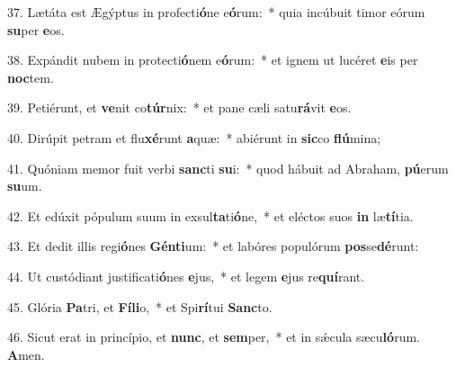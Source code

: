 37. Lætáta est Ægýptus in profecti\textbf{ó}ne e\textbf{ó}rum:~*  quia incúbuit timor eórum \textbf{su}per \textbf{e}os.\

38. Expándit nubem in protecti\textbf{ó}nem e\textbf{ó}rum:~*  et ignem ut lucéret \textbf{e}is per \textbf{noc}tem.\

39. Petiérunt, et \textbf{ve}nit co\textbf{túr}nix:~*  et pane cæli satu\textbf{rá}vit \textbf{e}os.\

40. Dirúpit petram et flu\textbf{xé}runt \textbf{a}quæ:~*  abiérunt in \textbf{sic}co \textbf{flú}mina;\

41. Quóniam memor fuit verbi \textbf{sanc}ti \textbf{su}i:~*  quod hábuit ad Abraham, \textbf{pú}erum \textbf{su}um.\

42. Et edúxit pópulum suum in exsul\textbf{ta}ti\textbf{ó}ne,~*  et eléctos suos \textbf{in} læ\textbf{tí}tia.\

43. Et dedit illis regi\textbf{ó}nes \textbf{Gén}\textbf{ti}um:~*  et labóres populórum \textbf{pos}se\textbf{dé}runt:\

44. Ut custódiant justificati\textbf{ó}nes \textbf{e}jus,~*  et legem \textbf{e}jus re\textbf{quí}rant.\

45. Glória \textbf{Pa}tri, et \textbf{Fí}\textbf{li}o,~*  et Spi\textbf{rí}tui \textbf{Sanc}to.\

46. Sicut erat in princípio, et \textbf{nunc}, et \textbf{sem}per,~*  et in sǽcula sæcu\textbf{ló}rum. \textbf{A}men.\

